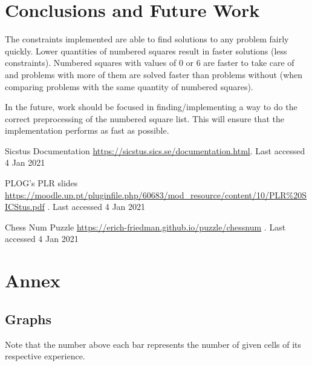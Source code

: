 \documentclass[runningheads]{llncs}
\begin{document}
\section{Conclusions and Future Work}
The constraints implemented are able to find solutions to any problem fairly
quickly. Lower quantities of numbered squares result in faster solutions
(less constraints). Numbered squares with values of 0 or 6 are faster to
take care of and problems with more of them are solved faster than problems
without (when comparing problems with the same quantity of numbered squares).

In the future, work should be focused in finding/implementing a way to do the
correct preprocessing of the numbered square list. This will ensure that the
implementation performs as fast as possible.

\begin{thebibliography}{8}
    Sicstus Documentation
        \href{https://sicstus.sics.se/documentation.html}{https://sicstus.sics.se/documentation.html}.
        Last accessed 4 Jan 2021

    PLOG's PLR slides 
    \href{https://moodle.up.pt/pluginfile.php/60683/mod\_resource/content/10/PLR\%20SICStus.pdf}{https://moodle.up.pt/pluginfile.php/60683/mod\_resource/content/10/PLR\%20SICStus.pdf}
    . Last accessed 4 Jan 2021

    Chess Num Puzzle 
    \href{https://erich-friedman.github.io/puzzle/chessnum}{https://erich-friedman.github.io/puzzle/chessnum}
    . Last accessed 4 Jan 2021
\end{thebibliography}

\section{Annex}
\subsection{Graphs}
Note that the number above each bar represents the number of given cells of
its respective experience.

\end{document}
